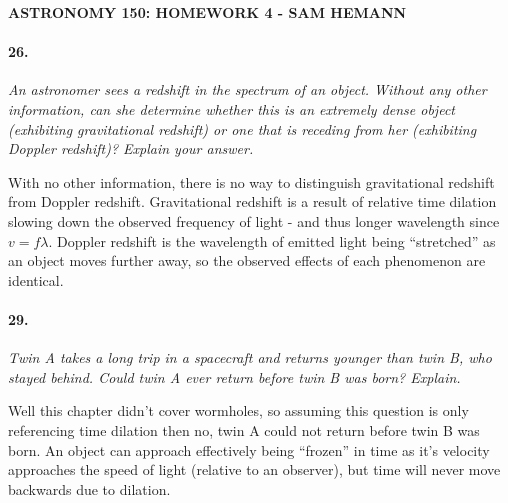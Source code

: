 \documentclass[letterpaper,11pt]{article}
\begin{document}
\begin{center}
	\bf
	ASTRONOMY 150: HOMEWORK 4 - SAM HEMANN
\end{center}



\paragraph{26.}
\it
An astronomer sees a redshift in the spectrum of an object. Without any other information, can she determine whether this is an extremely dense object (exhibiting gravitational redshift) or one that is receding from her (exhibiting Doppler redshift)? Explain your answer.
\smallskip
	\par
	\normalfont
	 With no other information, there is no way to distinguish gravitational redshift from Doppler redshift. Gravitational redshift is a result of relative time dilation slowing down the observed frequency of light - and thus longer wavelength since $v=f\lambda$. Doppler redshift is the wavelength of emitted light being ``stretched'' as an object moves further away, so the observed effects of each phenomenon are identical.



\paragraph{29.}
\it
Twin A takes a long trip in a spacecraft and returns younger than twin B, who stayed behind. Could twin A ever return before twin B was born? Explain.
\smallskip
	\par
	\normalfont
	Well this chapter didn't cover wormholes, so assuming this question is only referencing time dilation then no, twin A could not return before twin B was born. An object can approach effectively being ``frozen'' in time as it's velocity approaches the speed of light (relative to an observer), but time will never move backwards due to dilation.



\end{document}
